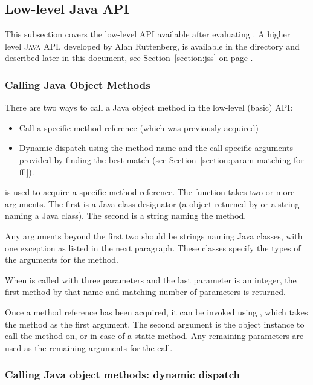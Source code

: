 \documentclass[10pt]{book}
\begin{document}
\subsection{Low-level Java API}

This subsection covers the low-level API available after evaluating
.  A higher level \textsc{Java} API, developed by Alan
Ruttenberg, is available in the  directory and described
later in this document, see Section~\ref{section:jss} on page
\pageref{section:jss}.

\subsubsection{Calling Java Object Methods}

There are two ways to call a Java object method in the low-level (basic) API:

\begin{itemize}
\item Call a specific method reference (which was previously acquired)
\item Dynamic dispatch using the method name and the call-specific
  arguments provided by finding the best match (see
  Section~\ref{section:param-matching-for-ffi}).
\end{itemize}

 is used to acquire a specific method reference.  The
function takes two or more arguments. The first is a Java class
designator (a  object returned by
 or a string naming a Java class). The second is a
string naming the method.

Any arguments beyond the first two should be strings naming Java
classes, with one exception as listed in the next paragraph. These
classes specify the types of the arguments for the method.

When  is called with three parameters and the last
parameter is an integer, the first method by that name and matching
number of parameters is returned.

Once a method reference has been acquired, it can be invoked using
, which takes the method as the first argument. The
second argument is the object instance to call the method on, or
 in case of a static method.  Any remaining parameters are
used as the remaining arguments for the call.

\subsubsection{Calling Java object methods: dynamic dispatch}
\end{document}

